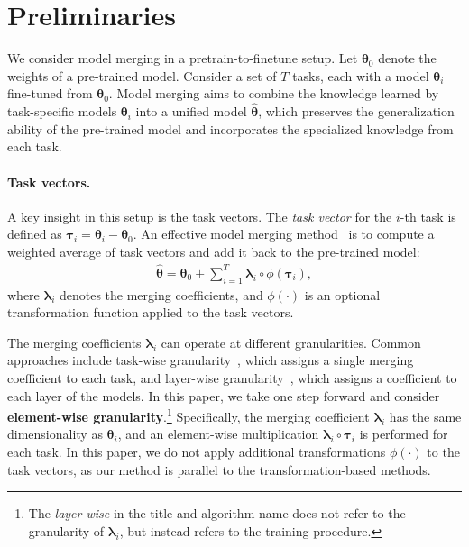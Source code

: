 
\section{Preliminaries}
We consider model merging in a pretrain-to-finetune setup. Let $\boldsymbol{\theta}_0$ denote the weights of a pre-trained model. Consider a set of $T$ tasks, each with a model $\boldsymbol{\theta}_i$ fine-tuned from $\boldsymbol{\theta}_0$.
Model merging aims to combine the knowledge learned by task-specific models $\boldsymbol{\theta}_i$ into a unified model $\hat{\boldsymbol{\theta}}$, which preserves the generalization ability of the pre-trained model and incorporates the specialized knowledge from each task. 


\vspace{-8pt}
\paragraph{Task vectors.} A key insight in this setup is the task vectors. The \textit{task vector} for the $i$-th task is defined as $\boldsymbol{\tau}_i = \boldsymbol{\theta}_i - \boldsymbol{\theta}_0$.
An effective model merging method~\citep{ilharco2022editing, zhang2023composing} is to compute a weighted average of task vectors and add it back to the pre-trained model: 
\vspace{-3pt}
\begin{align*} 
\hat{\boldsymbol{\theta}} = \boldsymbol{\theta}_0 + \sum_{i=1}^T \boldsymbol{\lambda}_i\circ \phi(\boldsymbol{\tau}_i), 
\end{align*}
where $\boldsymbol{\lambda}_i$ denotes the merging coefficients, and $\phi(\cdot)$ is an optional transformation function applied to the task vectors.

The merging coefficients $\boldsymbol{\lambda}_i$ can operate at different granularities. Common approaches include task-wise granularity~\citep{ilharco2022editing}, which assigns a single merging coefficient to each task, and layer-wise granularity~\citep{yang2023adamerging}, which assigns a coefficient to each layer of the models. In this paper, we take one step forward and consider \textbf{element-wise granularity}.\footnote{The \textit{layer-wise} in the title and algorithm name does not refer to the granularity of $\boldsymbol{\lambda}_i$, but instead  refers to the training procedure.}
Specifically, the
merging coefficient $\boldsymbol{\lambda}_{i}$ has the same dimensionality as
$\boldsymbol{\theta}_{i}$, and an element-wise multiplication $\boldsymbol{\lambda}_{i}\circ \boldsymbol{\tau}_{i}$ is performed for each task. In this paper, we do not apply additional transformations $\phi(\cdot)$ to the task vectors, as our method is parallel to the transformation-based methods.


